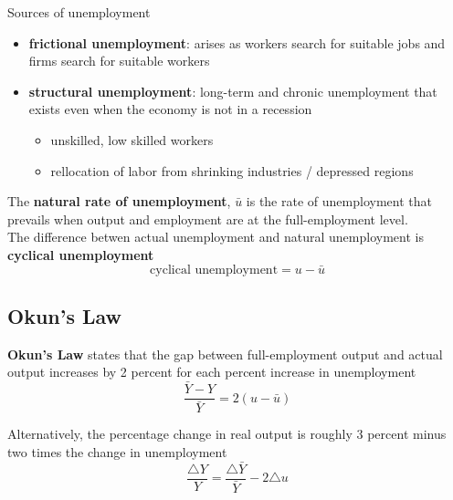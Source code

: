 \begin{remark}
    Sources of unemployment 
    \begin{itemize}
        \item \textbf{frictional unemployment}: arises as workers search for suitable jobs and firms search for suitable workers
        \item \textbf{structural unemployment}: long-term and chronic unemployment that exists even when the economy is not in a recession
        \begin{itemize}
            \item unskilled, low skilled workers
            \item rellocation of labor from shrinking industries / depressed regions
        \end{itemize} 
    \end{itemize} 
\end{remark}

\begin{definition}
    The \textbf{natural rate of unemployment}, $ \bar{u} $ is the rate of unemployment that prevails when output and employment are at the full-employment level. \\

    The difference betwen actual unemployment and natural unemployment is \textbf{cyclical unemployment} 
    \[
    \text{cyclical unemployment}= u - \bar{u} 
    \]
\end{definition}

\subsection{Okun's Law}
\begin{theorem}
    \textbf{Okun's Law} states that the gap between full-employment output and actual output increases by 2 percent for each percent increase in unemployment 
    \[
    \frac{\bar{Y} - Y }{\bar{Y} } = 2 \left( u  - \bar{u}  \right) 
    \]

    Alternatively, the percentage change in real output is roughly 3 percent minus two times the change in unemployment
    \[
    \frac{\triangle Y}{Y} = \frac{\triangle \bar{Y} }{ \bar{Y} }  - 2 \triangle u
    \]
\end{theorem}

